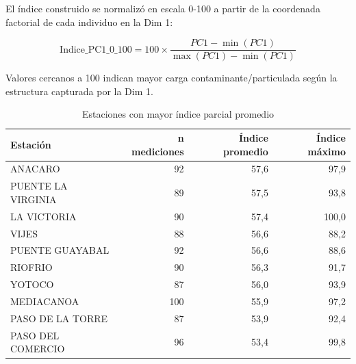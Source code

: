 \documentclass[12pt,letterpaper]{article}
\begin{document}
El índice construido se normalizó en escala 0-100 a partir de la coordenada factorial de cada individuo en la Dim 1:

\[
\text{Indice\_PC1\_0\_100} = 100 \times \frac{PC1 - \min(PC1)}{\max(PC1) - \min(PC1)}
\]

Valores cercanos a 100 indican mayor carga contaminante/particulada según la estructura capturada por la Dim 1.

\begin{table}[H]
\centering
\caption{Mayores valores individuales del índice parcial}
\end{table}

\begin{table}[H]
\centering
\caption{Estaciones con mayor índice parcial promedio}
\begin{tabular}{lrrr}
\toprule
\textbf{Estación} & \textbf{n mediciones} & \textbf{Índice promedio} & \textbf{Índice máximo} \\
\midrule
ANACARO & 92 & 57,6 & 97,9 \\
PUENTE LA VIRGINIA & 89 & 57,5 & 93,8 \\
LA VICTORIA & 90 & 57,4 & 100,0 \\
VIJES & 88 & 56,6 & 88,2 \\
PUENTE GUAYABAL & 92 & 56,6 & 88,6 \\
RIOFRIO & 90 & 56,3 & 91,7 \\
YOTOCO & 87 & 56,0 & 93,9 \\
MEDIACANOA & 100 & 55,9 & 97,2 \\
PASO DE LA TORRE & 87 & 53,9 & 92,4 \\
PASO DEL COMERCIO & 96 & 53,4 & 99,8 \\
\bottomrule
\end{tabular}
\end{table}
\end{document}
